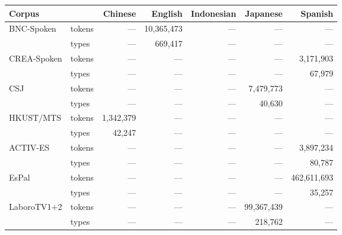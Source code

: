 \begin{tabular}{llrrrrr}
\toprule
Corpus &  & Chinese & English & Indonesian & Japanese & Spanish \\
\midrule
\multirow[c]{2}{*}{BNC-Spoken} & tokens & --- & 10,365,473 & --- & --- & --- \\
 & \cellcolor[HTML]{EEEEEE} types & \cellcolor[HTML]{EEEEEE} --- & \cellcolor[HTML]{EEEEEE} 669,417 & \cellcolor[HTML]{EEEEEE} --- & \cellcolor[HTML]{EEEEEE} --- & \cellcolor[HTML]{EEEEEE} --- \\
\multirow[c]{2}{*}{CREA-Spoken} & tokens & --- & --- & --- & --- & 3,171,903 \\
 & \cellcolor[HTML]{EEEEEE} types & \cellcolor[HTML]{EEEEEE} --- & \cellcolor[HTML]{EEEEEE} --- & \cellcolor[HTML]{EEEEEE} --- & \cellcolor[HTML]{EEEEEE} --- & \cellcolor[HTML]{EEEEEE} 67,979 \\
\multirow[c]{2}{*}{CSJ} & tokens & --- & --- & --- & 7,479,773 & --- \\
 & \cellcolor[HTML]{EEEEEE} types & \cellcolor[HTML]{EEEEEE} --- & \cellcolor[HTML]{EEEEEE} --- & \cellcolor[HTML]{EEEEEE} --- & \cellcolor[HTML]{EEEEEE} 40,630 & \cellcolor[HTML]{EEEEEE} --- \\
\multirow[c]{2}{*}{HKUST/MTS} & tokens & 1,342,379 & --- & --- & --- & --- \\
 & \cellcolor[HTML]{EEEEEE} types & \cellcolor[HTML]{EEEEEE} 42,247 & \cellcolor[HTML]{EEEEEE} --- & \cellcolor[HTML]{EEEEEE} --- & \cellcolor[HTML]{EEEEEE} --- & \cellcolor[HTML]{EEEEEE} --- \\
\multirow[c]{2}{*}{ACTIV-ES} & tokens & --- & --- & --- & --- & 3,897,234 \\
 & \cellcolor[HTML]{EEEEEE} types & \cellcolor[HTML]{EEEEEE} --- & \cellcolor[HTML]{EEEEEE} --- & \cellcolor[HTML]{EEEEEE} --- & \cellcolor[HTML]{EEEEEE} --- & \cellcolor[HTML]{EEEEEE} 80,787 \\
\multirow[c]{2}{*}{EsPal} & tokens & --- & --- & --- & --- & 462,611,693 \\
 & \cellcolor[HTML]{EEEEEE} types & \cellcolor[HTML]{EEEEEE} --- & \cellcolor[HTML]{EEEEEE} --- & \cellcolor[HTML]{EEEEEE} --- & \cellcolor[HTML]{EEEEEE} --- & \cellcolor[HTML]{EEEEEE} 35,257 \\
\multirow[c]{2}{*}{LaboroTV1+2} & tokens & --- & --- & --- & 99,367,439 & --- \\
 & \cellcolor[HTML]{EEEEEE} types & \cellcolor[HTML]{EEEEEE} --- & \cellcolor[HTML]{EEEEEE} --- & \cellcolor[HTML]{EEEEEE} --- & \cellcolor[HTML]{EEEEEE} 218,762 & \cellcolor[HTML]{EEEEEE} --- \\

\end{tabular}
